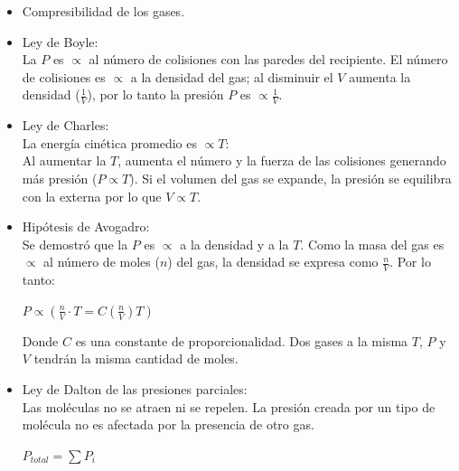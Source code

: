             \begin{itemize}
                \item Compresibilidad de los gases.
                \item Ley de Boyle: \\[2pt]
                    \sangria{} La $P$ es $\propto$ al número de colisiones con las paredes del recipiente. El número de colisiones es $\propto$ a la densidad del gas; al disminuir el $V$ aumenta la densidad ($\frac{1}{V}$), por lo tanto la presión $P$ es $\propto \frac{1}{V}$.
                \item Ley de Charles: \\[2pt]
                    \sangria{} La energía cinética promedio es $\propto T$:\\[2pt]
                    \sangria{} Al aumentar la $T$, aumenta el número y la fuerza de las colisiones generando más presión ($P \propto T$). Si el volumen del gas se expande, la presión se equilibra con la externa por lo que $V \propto T$.
                \item Hipótesis de Avogadro:\\[2pt]
                    \sangria{} Se demostró que la $P$ es $\propto$ a la densidad y a la $T$. Como la masa del gas es $\propto$ al número de moles ($n$) del gas, la densidad se expresa como $\frac{n}{V}$. Por lo tanto:
                    \columnbreak{}
                    \begin{center} 
                        $P \propto (\frac{n}{V} \cdot T = C (\frac{n}{V}) T)$
                    \end{center}
                    Donde $C$ es una constante de proporcionalidad. Dos gases a la misma $T$, $P$ y $V$ tendrán la misma cantidad de moles.
                \item Ley de Dalton de las presiones parciales:\\[2pt]
                    \sangria{} Las moléculas no se atraen ni se repelen. La presión creada por un tipo de molécula no es afectada por la presencia de otro gas. 
                    \begin{center} $P_{total} = \sum P_i$ \end{center}
            \end{itemize}
